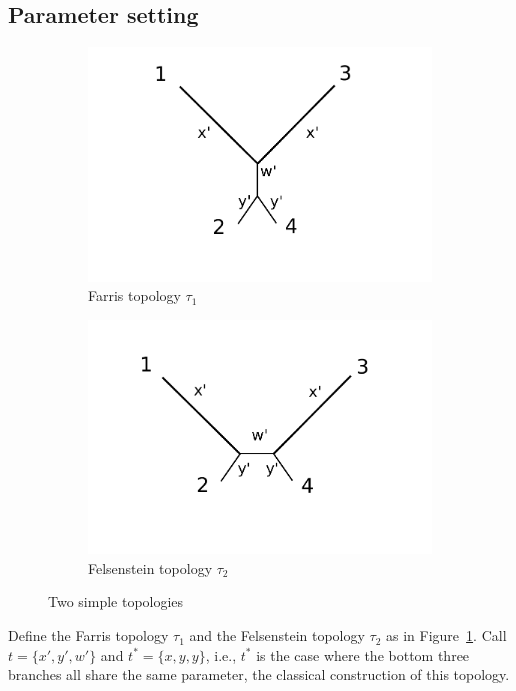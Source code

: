 \documentclass[a4paper]{article}
\begin{document}
\subsection{Parameter setting}

\begin{figure}
\centering
\begin{subfigure}{.45\linewidth}
\centering
\includegraphics[width=.95\textwidth]{farris_blank}
\caption[short]{Farris topology $\tau_1$}
\end{subfigure}
\begin{subfigure}{.45\linewidth}
\centering
\includegraphics[width=.95\textwidth]{felsenstein_blank}
\caption[short]{Felsenstein topology $\tau_2$}
\end{subfigure}
\caption{Two simple topologies}
\label{fig:farris-fels-top}
\end{figure}

Define the Farris topology $\tau_1$ and the Felsenstein topology $\tau_2$ as in Figure~\ref{fig:farris-fels-top}.
Call $t=\{x',y',w'\}$ and $t^*=\{x,y,y\}$, i.e., $t^*$ is the case where the bottom three branches all share the same parameter, the classical construction of this topology.
\end{document}
